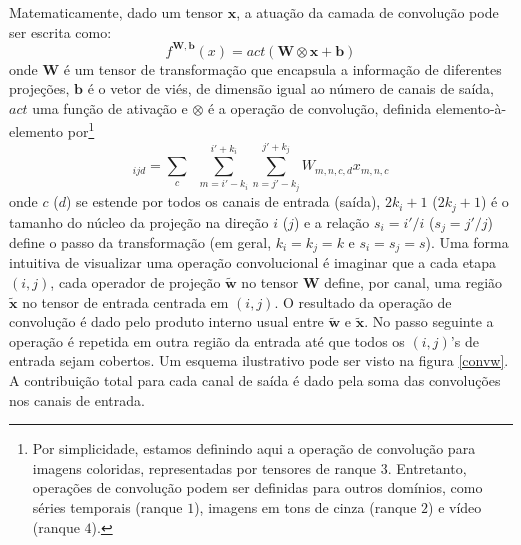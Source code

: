 Matematicamente, dado um tensor $\mathbf{x}$, a atuação da camada de convolução pode ser escrita como:
\begin{equation}
f^{\mathbf{W}, \mathbf{b}}(x) = act(\mathbf{W} \otimes \mathbf{x} + \mathbf{b})
\end{equation}
onde $\mathbf{W}$ é um tensor de transformação que encapsula a informação de diferentes projeções, $\mathbf{b}$ é o vetor de viés, de dimensão igual ao número de canais de saída, $act$ uma função de ativação e $\otimes$ é a operação de convolução, definida elemento-à-elemento por\footnote{Por simplicidade, estamos definindo aqui a operação de convolução para imagens coloridas, representadas por tensores de ranque $3$. Entretanto, operações de convolução podem ser definidas para outros domínios, como séries temporais (ranque $1$), imagens em tons de cinza (ranque $2$) e vídeo (ranque $4$).}
\begin{equation}
[\mathbf{W} \otimes \mathbf{x}]_{ijd} = \sum_{c} \;\; \sum_{m=i'-k_i}^{i'+ k_i} \sum_{n=j'-k_j}^{j'+k_j} W_{m, n, c, d} x_{m, n, c}
\end{equation}
onde $c$ ($d$) se estende por todos os canais de entrada (saída), $2k_i+1$ ($2k_j+1$) é o tamanho do núcleo da projeção na direção $i$ ($j$) e a relação $s_i = i'/i$ ($s_j = j'/j$) define o passo da transformação (em geral, $k_i = k_j = k$ e $s_i = s_j = s$). Uma forma intuitiva de visualizar uma operação convolucional é imaginar que a cada etapa $(i,j)$, cada operador de projeção $\tilde{\mathbf{w}}$ no tensor $\mathbf{W}$ define, por canal, uma região $\tilde{\mathbf{x}}$ no tensor de entrada centrada em $(i,j)$. O resultado da operação de convolução é dado pelo produto interno usual entre $\tilde{\mathbf{w}}$ e $\tilde{\mathbf{x}}$. No passo seguinte a operação é repetida em outra região da entrada até que todos os $(i,j)$'s de entrada sejam cobertos. Um esquema ilustrativo pode ser visto na figura \ref{convw}. A contribuição total para cada canal de saída é dado pela soma das convoluções nos canais de entrada. 

